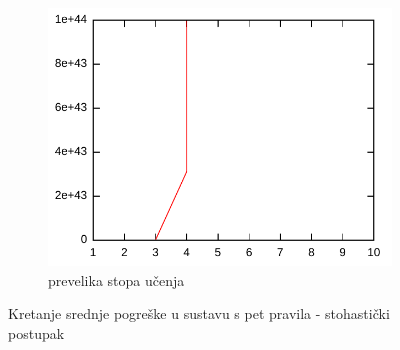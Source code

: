 \documentclass{article}
\begin{document}
\begin{figure}[h]
\begin{subfigure}[b]{0.32\textwidth}
        \includegraphics[width=\textwidth]{img/eta-stochastic-high.pdf}
        \caption{prevelika stopa učenja}
    \end{subfigure}
    \hfill
    \caption{Kretanje srednje pogreške u sustavu s pet pravila - stohastički postupak}
    \label{eta-stochastic}
\end{figure}
\end{document}
